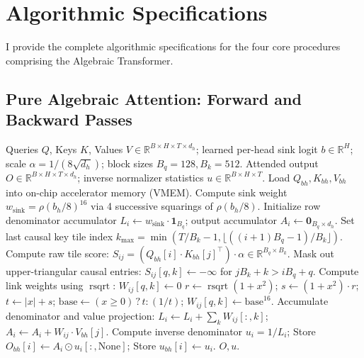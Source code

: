 \documentclass[11pt,a4paper]{article}
\theoremstyle{definition}
\newcommand{\rsqrt}{\operatorname{rsqrt}}
\begin{document}
\section{Algorithmic Specifications}
\label{sec:algorithms}

I provide the complete algorithmic specifications for the four core procedures comprising the Algebraic Transformer.

\subsection{Pure Algebraic Attention: Forward and Backward Passes}

\begin{algorithm}[H]
\caption{Pure Algebraic Attention Forward Pass (Whole-Head Resident Tiling)}
\label{alg:attn_fwd}
\begin{algorithmic}[1]
\Require Queries $Q$, Keys $K$, Values $V \in \mathbb{R}^{B \times H \times T \times d_h}$; learned per-head sink logit $b \in \mathbb{R}^H$; scale $\alpha = 1/(8\sqrt{d_h})$; block sizes $B_q = 128, B_k = 512$.
\Ensure Attended output $O \in \mathbb{R}^{B \times H \times T \times d_h}$; inverse normalizer statistics $u \in \mathbb{R}^{B \times H \times T}$.
    \State Load $Q_{bh}, K_{bh}, V_{bh}$ into on-chip accelerator memory (VMEM).
    \State Compute sink weight $w_{\text{sink}} = \rho(b_h / 8)^{16}$ via 4 successive squarings of $\rho(b_h/8)$.
        \State Initialize row denominator accumulator $L_i \leftarrow w_{\text{sink}} \cdot \mathbf{1}_{B_q}$; output accumulator $A_i \leftarrow \mathbf{0}_{B_q \times d_h}$.
        \State Set last causal key tile index $k_{\max} = \min(T/B_k - 1, \lfloor((i+1)B_q - 1)/B_k\rfloor)$.
            \State Compute raw tile score: $S_{ij} = (Q_{bh}[i] \cdot K_{bh}[j]^\top) \cdot \alpha \in \mathbb{R}^{B_q \times B_k}$.
             Mask out upper-triangular causal entries: $S_{ij}[q, k] \leftarrow -\infty$ for $j B_k + k > i B_q + q$.
            \EndIf
            \State Compute link weights using $\rsqrt$:
                 $W_{ij}[q, k] \leftarrow 0$
                \Else{} $r \leftarrow \rsqrt(1 + x^2)$; \quad $s \leftarrow (1 + x^2) \cdot r$; \quad $t \leftarrow |x| + s$; \quad $\text{base} \leftarrow (x \ge 0) \mathrel{?} t : (1/t)$; \quad $W_{ij}[q, k] \leftarrow \text{base}^{16}$.
                \EndIf
            \EndFor
            \State Accumulate denominator and value projection: $L_i \leftarrow L_i + \sum_k W_{ij}[:, k]$; \quad $A_i \leftarrow A_i + W_{ij} \cdot V_{bh}[j]$.
        \EndFor
        \State Compute inverse denominator $u_i = 1 / L_i$; \quad Store $O_{bh}[i] \leftarrow A_i \odot u_i[:, \text{None}]$; \quad Store $u_{bh}[i] \leftarrow u_i$.
    \EndFor
\EndFor
\State \Return $O, u$.
\end{algorithmic}
\end{algorithm}
\end{document}
